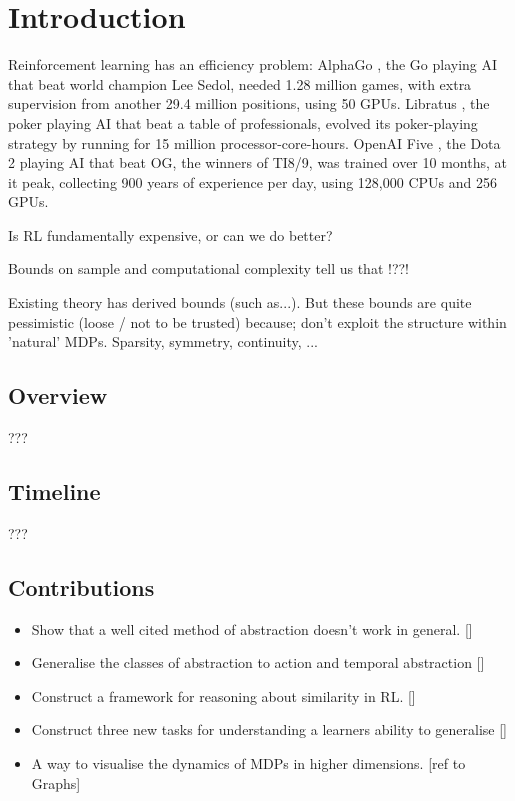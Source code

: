\chapter{Introduction}\label{C:intro}

Reinforcement learning has an efficiency problem: AlphaGo \cite{Silver2016a}, the Go
playing AI that beat world champion Lee Sedol, needed 1.28 million games, with
extra supervision from another 29.4 million positions, using 50 GPUs.
Libratus \cite{Brown2018b}, the poker playing AI that beat a table of professionals,
evolved its poker-playing strategy by running for 15 million processor-core-hours.
OpenAI Five \cite{Berner2019}, the Dota 2 playing AI that beat OG, the winners of TI8/9, was
trained over 10 months, at it peak, collecting 900 years of experience per day, using
128,000 CPUs and 256 GPUs.

Is RL fundamentally expensive, or can we do better?

Bounds on sample and computational complexity tell us that !??!



Existing theory has derived bounds (such as...). But these bounds are quite pessimistic (loose / not to be trusted) because;
don't exploit the structure within 'natural' MDPs. Sparsity, symmetry, continuity, ...

\section{Overview}

???

\section{Timeline}

???


\section{Contributions}

\begin{itemize}
  \tightlist
  \item Show that a well cited method of abstraction doesn't work in general. []
  \item Generalise the classes of abstraction to action and temporal abstraction []
  \item Construct a framework for reasoning about similarity in RL. []
  \item Construct three new tasks for understanding a learners ability to generalise []
  \item A way to visualise the dynamics of MDPs in higher dimensions. [ref to Graphs]
\end{itemize}
